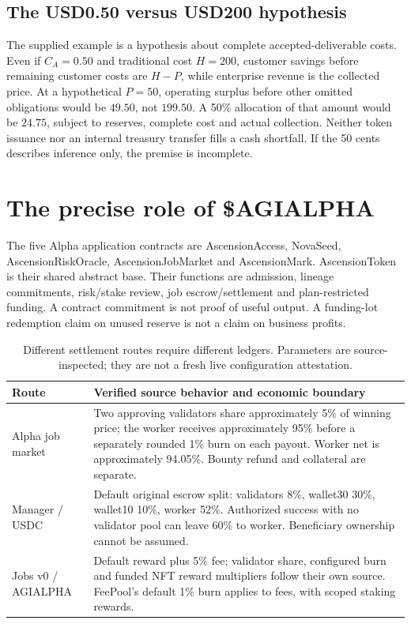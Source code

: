 \documentclass[11pt,a4paper]{article}
\begin{document}


\subsection{The USD0.50 versus USD200 hypothesis}
The supplied example is a hypothesis about complete accepted-deliverable costs. Even if $C_A=0.50$ and traditional cost $H=200$, customer savings before remaining customer costs are $H-P$, while enterprise revenue is the collected price. At a hypothetical $P=50$, operating surplus before other omitted obligations would be $49.50$, not $199.50$. A 50\% allocation of that amount would be $24.75$, subject to reserves, complete cost and actual collection. Neither token issuance nor an internal treasury transfer fills a cash shortfall. If the 50 cents describes inference only, the premise is incomplete.

\section{The precise role of \$AGIALPHA}
\label{sec:token}
The five Alpha application contracts are AscensionAccess, NovaSeed, AscensionRiskOracle, AscensionJobMarket and AscensionMark. AscensionToken is their shared abstract base. Their functions are admission, lineage commitments, risk/stake review, job escrow/settlement and plan-restricted funding. A contract commitment is not proof of useful output. A funding-lot redemption claim on unused reserve is not a claim on business profits.\citep{alpha_contracts}

\begin{table}[H]\small
\begin{tabularx}{\linewidth}{p{.22\linewidth}X}
\toprule Route & Verified source behavior and economic boundary \\\midrule
Alpha job market & Two approving validators share approximately 5\% of winning price; the worker receives approximately 95\% before a separately rounded 1\% burn on each payout. Worker net is approximately 94.05\%. Bounty refund and collateral are separate. \\
Manager / USDC & Default original escrow split: validators 8\%, wallet30 30\%, wallet10 10\%, worker 52\%. Authorized success with no validator pool can leave 60\% to worker. Beneficiary ownership cannot be assumed. \\
Jobs v0 / AGIALPHA & Default reward plus 5\% fee; validator share, configured burn and funded NFT reward multipliers follow their own source. FeePool's default 1\% burn applies to fees, with scoped staking rewards. \\\bottomrule
\end{tabularx}
\caption{Different settlement routes require different ledgers. Parameters are source-inspected; they are not a fresh live configuration attestation.}
\end{table}
\end{document}
